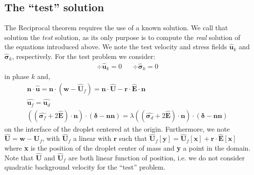 \subsection{The ``test'' solution}

The Reciprocal theorem requires the use of a known solution.
We call that solution the \textit{test} solution, as its only purpose is to compute the \textit{real} solution of the equations introduced above. 
We note the test velocity and stress fields $\hat{\textbf{u}}_k$ and $\hat{\bm\sigma}_k$, respectively. 
For the test problem we consider:
\begin{align}
    \div \hat{\textbf{u}}_k = 0 
    && \div \hat{\bm\sigma}_k = 0 
    \label{eq:test_sol}
\end{align}
in phase $k$ and, 
\begin{align}    
    \textbf{n}\cdot \hat{\textbf{u}}=  \textbf{n}\cdot(\textbf{w} - \hat{\textbf{U}}_f) = \textbf{n}\cdot \hat{\textbf{U}} - \textbf{r}\cdot \hat{\textbf{E}} \cdot \textbf{n}\\
    \hat{\textbf{u}_f} = \hat{\textbf{u}_d}\\
    ((\hat{\bm\sigma_f}+2\hat{\textbf{E}})\cdot \textbf{n}) \cdot (\bm\delta - \textbf{nn})
    = 
    \lambda ((\hat{\bm\sigma_d}+2\hat{\textbf{E}})\cdot \textbf{n}) \cdot (\bm\delta - \textbf{nn}) \label{eq:bc_stress}
\end{align} 
on the interface of the droplet centered at the origin. 
Furthermore, we note $\hat{\textbf{U}} = \textbf{w} - \hat{\textbf{U}}_f$, with $\hat{\textbf{U}}_f$ a linear with $\textbf{r}$ such that $ \hat{\textbf{U}}_f[\textbf{y}] = \hat{\textbf{U}}_f[\textbf{x}]+\textbf{r}\cdot \hat{\textbf{E}}[\textbf{x}]$  where \textbf{x} is the position of the droplet center of mass and \textbf{y} a point in the domain.
Note that $\hat{\textbf{U}}$ and $\hat{\textbf{U}}_f$ are both linear function of position, i.e. we do not consider quadratic background velocity for the ``test''  problem. 

